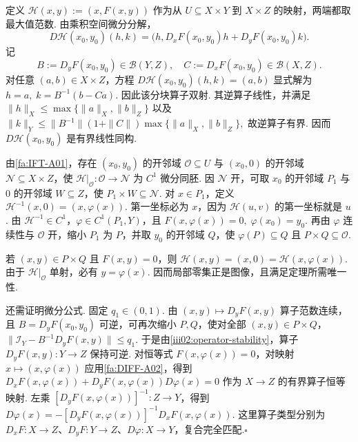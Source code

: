 \begin{FAProof}
定义
\(\displaystyle \mathcal H(x,y) := (x,F(x,y))\)
作为从 \(\displaystyle U\subseteq X\times Y\) 到 \(\displaystyle X\times Z\) 的映射，两端都取最大值范数. 由乘积空间微分分解，
\[
D\mathcal H(x_0,y_0)(h,k)
=
\bigl(h,D_xF(x_0,y_0)h+D_yF(x_0,y_0)k\bigr).
\]
记
\[
B:=D_yF(x_0,y_0)\in\mathcal B(Y,Z),
\quad
C:=D_xF(x_0,y_0)\in\mathcal B(X,Z).
\]
对任意 \(\displaystyle(a,b)\in X\times Z\)，方程
\(\displaystyle D\mathcal H(x_0,y_0)(h,k) = (a,b)\)
显式解为
\(\displaystyle h=a, \; k=B^{-1}(b-Ca).\)
因此该分块算子双射. 其逆算子线性，并满足
\(\displaystyle \|h\|_X \leqslant \max\{\|a\|_X,\|b\|_Z\}\)
以及
\(\displaystyle \|k\|_Y \leqslant \|B^{-1}\|(1+\|C\|) \max\{\|a\|_X,\|b\|_Z\},\)
故逆算子有界. 因而 \(\displaystyle D\mathcal H(x_0,y_0)\) 是有界线性同构.

由\autoref{fa:IFT-A01}，存在 \(\displaystyle(x_0,y_0)\) 的开邻域 \(\displaystyle\mathcal O\subseteq U\) 与 \(\displaystyle(x_0,0)\) 的开邻域 \(\displaystyle\mathcal N\subseteq X\times Z\)，使
\(\displaystyle \mathcal H|_{\mathcal O}:\mathcal O\to\mathcal N\)
为 \(\displaystyle C^1\) 微分同胚. 因 \(\displaystyle\mathcal N\) 开，可取 \(\displaystyle x_0\) 的开邻域 \(\displaystyle P_1\) 与 \(\displaystyle0\) 的开邻域 \(\displaystyle W\subseteq Z\)，使
\(\displaystyle P_1\times W \subseteq \mathcal N.\)
对 \(\displaystyle x\in P_1\)，定义
\(\displaystyle \mathcal H^{-1}(x,0) = (x,\varphi(x)).\)
第一坐标必为 \(\displaystyle x\)，因为 \(\displaystyle\mathcal H(u,v)\) 的第一坐标就是 \(\displaystyle u\). 由 \(\displaystyle\mathcal H^{-1}\in C^1\)，\(\displaystyle\varphi\in C^1(P_1,Y)\)，且
\(\displaystyle F(x,\varphi(x))=0, \; \varphi(x_0)=y_0.\)
再由 \(\displaystyle\varphi\) 连续性与 \(\displaystyle\mathcal O\) 开，缩小 \(\displaystyle P_1\) 为 \(\displaystyle P\)，并取 \(\displaystyle y_0\) 的开邻域 \(\displaystyle Q\)，使 \(\displaystyle\varphi(P)\subseteq Q\) 且 \(\displaystyle P\times Q\subseteq\mathcal O\).

若 \(\displaystyle(x,y)\in P\times Q\) 且 \(\displaystyle F(x,y)=0\)，则
\(\displaystyle \mathcal H(x,y)=(x,0)=\mathcal H(x,\varphi(x)).\)
由于 \(\displaystyle\mathcal H|_{\mathcal O}\) 单射，必有 \(\displaystyle y=\varphi(x)\). 因而局部零集正是图像，且满足定理所需唯一性.

还需证明微分公式. 固定 \(\displaystyle q_1\in(0,1)\). 由 \(\displaystyle(x,y)\mapsto D_yF(x,y)\) 算子范数连续，且 \(\displaystyle B=D_yF(x_0,y_0)\) 可逆，可再次缩小 \(\displaystyle P,Q\)，使对全部 \(\displaystyle(x,y)\in P\times Q\)，
\(\displaystyle \|\mathcal I_Y-B^{-1}D_yF(x,y)\| \leqslant q_1.\)
于是由\autoref{iii02:operator-stability}，算子 \(\displaystyle D_yF(x,y):Y\to Z\) 保持可逆. 对恒等式 \(\displaystyle F(x,\varphi(x))=0\)，对映射 \(\displaystyle x\mapsto(x,\varphi(x))\) 应用\autoref{fa:DIFF-A02}，得到
\(\displaystyle D_xF(x,\varphi(x)) + D_yF(x,\varphi(x))D\varphi(x) = 0\)
作为 \(\displaystyle X\to Z\) 的有界算子恒等映射. 左乘 \(\displaystyle[D_yF(x,\varphi(x))]^{-1}:Z\to Y\)，得到
\(\displaystyle D\varphi(x) = -[D_yF(x,\varphi(x))]^{-1}D_xF(x,\varphi(x)).\)
这里算子类型分别为 \(\displaystyle D_xF:X\to Z\)、\(\displaystyle D_yF:Y\to Z\)、\(\displaystyle D\varphi:X\to Y\)，复合完全匹配.\hfill\(\square\)

\end{FAProof}

